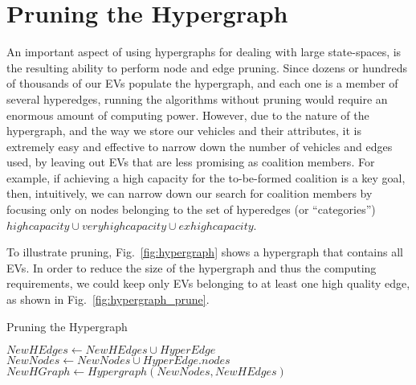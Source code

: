 

\section{Pruning the Hypergraph}\label{sec:pruning}

An important aspect of using hypergraphs for dealing with large state-spaces, is the resulting ability to perform node and edge pruning. Since dozens or hundreds of thousands of our EVs populate the hypergraph, and each one is a member of several hyperedges, running the algorithms without pruning would require an enormous amount of computing power. However, due to the nature of the hypergraph, and the way we store our vehicles and their attributes, it is extremely easy and effective to narrow down the number of vehicles and edges used, by leaving out EVs that are less promising as coalition members. For example, if achieving a high capacity for the to-be-formed coalition is a key goal, then, intuitively, we can narrow down our search for coalition members by focusing only on nodes belonging to the set of hyperedges (or ``categories'') $high capacity \cup very high capacity \cup ex high capacity$. 

To illustrate pruning, Fig.~\ref{fig:hypergraph} shows a hypergraph that contains all EVs. In order to reduce the size of the hypergraph and thus the computing requirements, we could keep only EVs belonging to at least one high quality edge, as shown in Fig.~\ref{fig:hypergraph_prune}. 


\begin{algorithm}
	\caption{Pruning the Hypergraph}\label{alg:pruning}
	\begin{algorithmic}[1]
		\State $NewHEdges\gets NewHEdges \cup HyperEdge$
		\State $NewNodes\gets NewNodes \cup HyperEdge.nodes$
		\EndIf
		\EndFor
		\State $NewHGraph \gets Hypergraph(NewNodes, NewHEdges)$
		\EndProcedure
	\end{algorithmic}
\end{algorithm}

